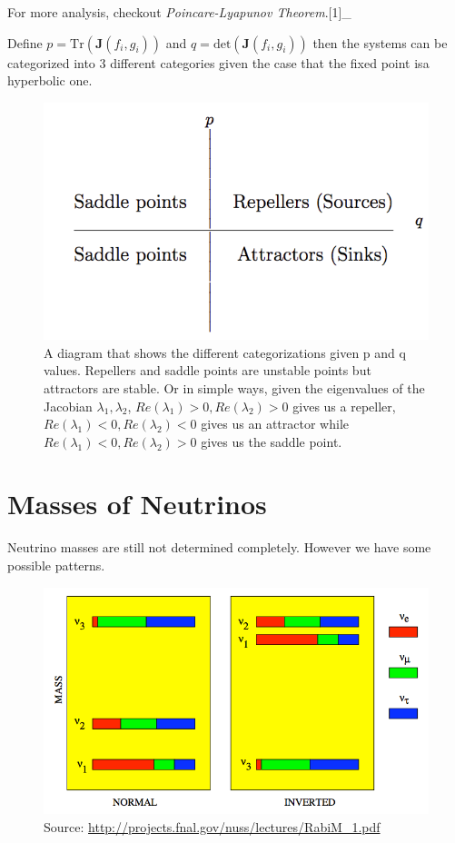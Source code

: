 \documentclass[letterpaper,12pt,english]{sphinxmanual}
\begin{document}
For more analysis, checkout \emph{Poincare-Lyapunov Theorem}.{[}1{]}\_

Define \(p=\mathrm{Tr}(\mathbf{J}(f_i,g_i))\) and \(q=\mathrm{det}(\mathbf{J}(f_i,g_i))\) then the systems can be categorized into 3 different categories given the case that the fixed point isa hyperbolic one.
\begin{figure}[htbp]
\centering
\capstart

\includegraphics{fixedpoints-massoudmalek.png}
\caption{A diagram that shows the different categorizations given p and q values. Repellers and saddle points are unstable points but attractors are stable. Or in simple ways, given the eigenvalues of the Jacobian \(\lambda_1, \lambda_2\), \(Re(\lambda_1)>0, Re(\lambda_2)>0\) gives us a repeller, \(Re(\lambda_1)<0, Re(\lambda_2)<0\) gives us an attractor while \(Re(\lambda_1)<0, Re(\lambda_2)>0\) gives us the saddle point.}\end{figure}


\chapter{Masses of Neutrinos}
\label{mass::doc}\label{mass:masses-of-neutrinos}
Neutrino masses are still not determined completely. However we have some possible patterns.
\begin{figure}[htbp]
\centering
\capstart

\includegraphics{massPatterns.png}
\caption{Source: \href{http://projects.fnal.gov/nuss/lectures/RabiM\_1.pdf}{http://projects.fnal.gov/nuss/lectures/RabiM\_1.pdf}}\end{figure}
\end{document}
